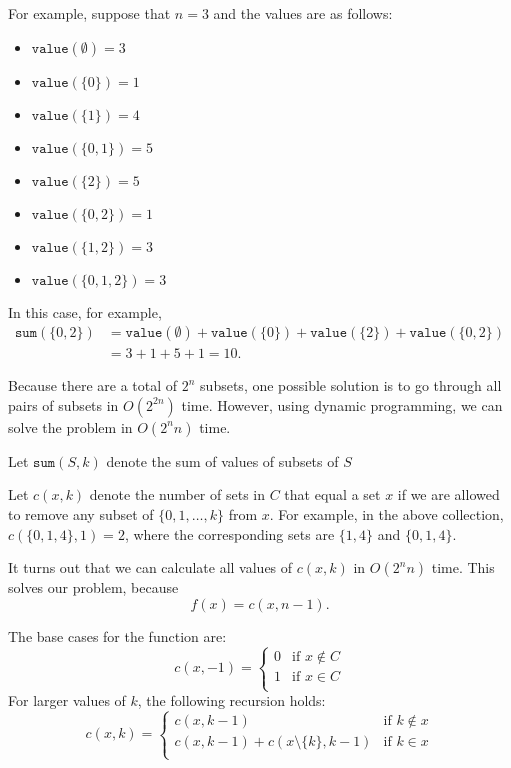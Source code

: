 For example, suppose that $n=3$ and the values are as follows:
\begin{multicols}{2}
\begin{itemize}
\item $\texttt{value}(\emptyset) = 3$
\item $\texttt{value}(\{0\}) = 1$
\item $\texttt{value}(\{1\}) = 4$
\item $\texttt{value}(\{0,1\}) = 5$
\item $\texttt{value}(\{2\}) = 5$
\item $\texttt{value}(\{0,2\}) = 1$
\item $\texttt{value}(\{1,2\}) = 3$
\item $\texttt{value}(\{0,1,2\}) = 3$
\end{itemize}
\end{multicols}
In this case, for example,
\begin{equation*}
\begin{split}
\texttt{sum}(\{0,2\}) &= \texttt{value}(\emptyset)+\texttt{value}(\{0\})+\texttt{value}(\{2\})+\texttt{value}(\{0,2\}) \\ 
                      &= 3 + 1 + 5 + 1 = 10.
\end{split}
\end{equation*}

Because there are a total of $2^n$ subsets,
one possible solution is to go through all
pairs of subsets in $O(2^{2n})$ time.
However, using dynamic programming, we
can solve the problem in $O(2^n n)$ time.

Let $\texttt{sum}(S,k)$ denote the sum of
values of subsets of $S$


Let $c(x,k)$ denote the number of sets in
$C$ that equal a set $x$
if we are allowed to remove any subset of
$\{0,1,\ldots,k\}$ from $x$.
For example, in the above collection,
$c(\{0,1,4\},1)=2$,
where the corresponding sets are
$\{1,4\}$ and $\{0,1,4\}$.

It turns out that we can calculate all
values of $c(x,k)$ in $O(2^n n)$ time.
This solves our problem, because
\[f(x)=c(x,n-1).\]

The base cases for the function are:
\begin{equation*}
    c(x,-1) = \begin{cases}
               0 & \textrm{if $x \notin C$}\\
               1 & \textrm{if $x \in C$}\\
           \end{cases}
\end{equation*}
For larger values of $k$, the following recursion holds:
\begin{equation*}
    c(x,k) = \begin{cases}
               c(x,k-1)          & \textrm{if $k \notin x$}\\
               c(x,k-1)+c(x \setminus \{k\},k-1)    & \textrm{if $k \in x$}\\
           \end{cases}
\end{equation*}

